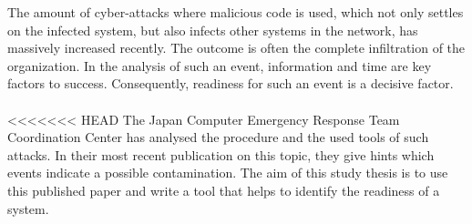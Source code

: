 \thispagestyle{plain}
\renewcommand\section{\stdsection}
\vspace{-0.25cm}
\thispagestyle{plain}
The amount of cyber-attacks where malicious code is used, which not only settles on the infected system, but also infects other systems in the network, has massively increased recently. The outcome is often the complete infiltration of the organization. In the analysis of such an event, information and time are key factors to success. Consequently, readiness for such an event is a decisive factor. \\\\
<<<<<<< HEAD
The Japan Computer Emergency Response Team Coordination Center has analysed the procedure and the used tools of such attacks. In their most recent publication on this topic, they give hints which events indicate a possible contamination. The aim of this study thesis is to use this published paper and write a tool that helps to identify the readiness of a system.

